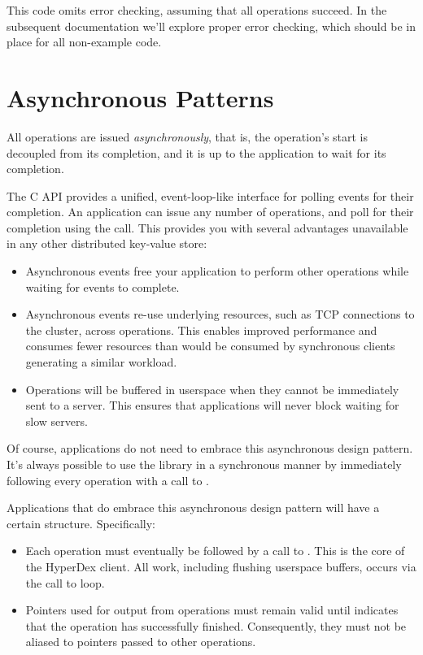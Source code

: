This code omits error checking, assuming that all operations succeed.  In the
subsequent documentation we'll explore proper error checking, which should be in
place for all non-example code.

\section{Asynchronous Patterns}
\label{sec:api:c:client:async}

All operations are issued {\em asynchronously}, that is, the operation's start
is decoupled from its completion, and it is up to the application to wait for
its completion.

The C API provides a unified, event-loop-like interface for polling events for
their completion.  An application can issue any number of operations, and poll
for their completion using the  call.  This
provides you with several advantages unavailable in any other distributed
key-value store:

\begin{itemize}
\item Asynchronous events free your application to perform other operations
while waiting for events to complete.

\item Asynchronous events re-use underlying resources, such as TCP connections
to the cluster, across operations.  This enables improved performance and
consumes fewer resources than would be consumed by synchronous clients
generating a similar workload.

\item Operations will be buffered in userspace when they cannot be immediately
sent to a server.  This ensures that applications will never block waiting for
slow servers.
\end{itemize}

Of course, applications do not need to embrace this asynchronous design pattern.
It's always possible to use the library in a synchronous manner by immediately
following every operation with a call to .

Applications that do embrace this asynchronous design pattern will have a
certain structure.  Specifically:

\begin{itemize}
\item Each operation must eventually be followed by a call to
.  This is the core of the HyperDex client.  All
work, including flushing userspace buffers, occurs via the call to loop.

\item Pointers used for output from operations must remain valid until
 indicates that the operation has successfully
finished.  Consequently, they must not be aliased to pointers passed to other
operations.
\end{itemize}

